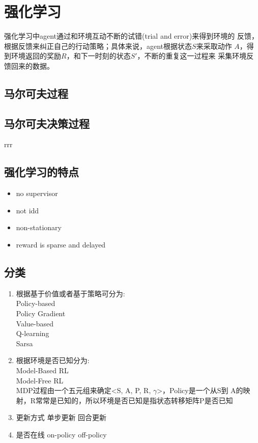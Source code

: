 \documentclass{book}
\begin{document}
\chapter{强化学习}
强化学习中agent通过和环境互动不断的试错(trial and error)来得到环境的
反馈，根据反馈来纠正自己的行动策略；具体来说，agent根据状态$S$来采取动作
$A$，得到环境返回的奖励$R$，和下一时刻的状态$S'$，不断的重复这一过程来
采集环境反馈回来的数据。\\
\section{马尔可夫过程}

\section{马尔可夫决策过程}
rrr
\section{强化学习的特点}
\begin{itemize}
	\item no supervisor
	\item not idd
	\item non-stationary
	\item reward is sparse and delayed
\end{itemize}
\section{分类}
\begin{enumerate}
\item 根据基于价值或者基于策略可分为:\\
Policy-based\\
Policy Gradient\\

Value-based\\
Q-learning\\
Sarsa\\

\item 根据环境是否已知分为:\\
Model-Based RL\\
Model-Free RL\\
MDP过程由一个五元组来确定<S, A, P, R, $\gamma$>，Policy是一个从S到
A的映射，R常常是已知的，所以环境是否已知是指状态转移矩阵P是否已知

\item 更新方式
单步更新
回合更新

\item 是否在线
on-policy
off-policy
\end{enumerate}
\end{document}
